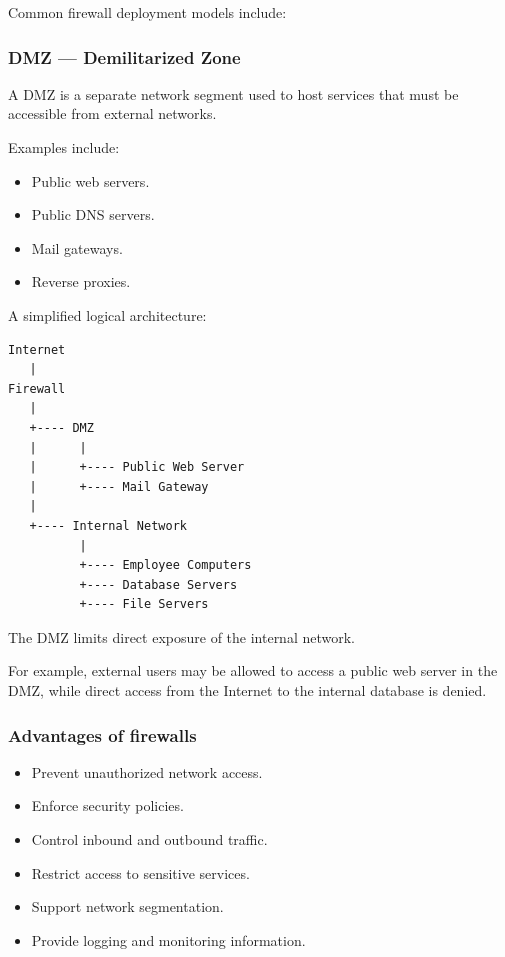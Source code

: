Common firewall deployment models include:


\subsubsection{DMZ --- Demilitarized Zone}

A DMZ is a separate network segment used to host services that must be accessible from external networks.

Examples include:

\begin{itemize}
\item Public web servers.
\item Public DNS servers.
\item Mail gateways.
\item Reverse proxies.
\end{itemize}

A simplified logical architecture:

\begin{lstlisting}
Internet
   |
Firewall
   |
   +---- DMZ
   |      |
   |      +---- Public Web Server
   |      +---- Mail Gateway
   |
   +---- Internal Network
          |
          +---- Employee Computers
          +---- Database Servers
          +---- File Servers
\end{lstlisting}

The DMZ limits direct exposure of the internal network.

For example, external users may be allowed to access a public web server in the DMZ, while direct access from the Internet to the internal database is denied.

\subsubsection{Advantages of firewalls}

\begin{itemize}
\item Prevent unauthorized network access.
\item Enforce security policies.
\item Control inbound and outbound traffic.
\item Restrict access to sensitive services.
\item Support network segmentation.
\item Provide logging and monitoring information.
\end{itemize}

